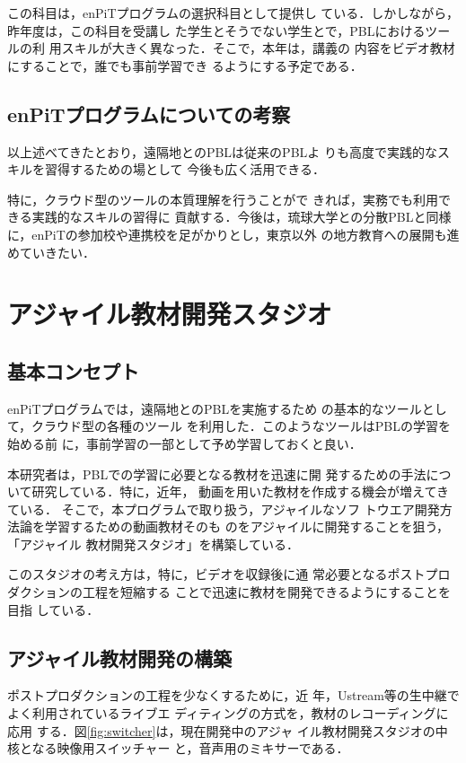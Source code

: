 \documentclass[a4j, 12Q, twocolumn, twoside]{jsarticle}
\begin{document}
この科目は，enPiTプログラムの選択科目として提供し
ている．しかしながら，昨年度は，この科目を受講し
た学生とそうでない学生とで，PBLにおけるツールの利
用スキルが大きく異なった．そこで，本年は，講義の
内容をビデオ教材にすることで，誰でも事前学習でき
るようにする予定である．


\subsection{enPiTプログラムについての考察}
以上述べてきたとおり，遠隔地とのPBLは従来のPBLよ
りも高度で実践的なスキルを習得するための場として
今後も広く活用できる．

特に，クラウド型のツールの本質理解を行うことがで
きれば，実務でも利用できる実践的なスキルの習得に
貢献する．今後は，琉球大学との分散PBLと同様
に，enPiTの参加校や連携校を足がかりとし，東京以外
の地方教育への展開も進めていきたい．

\section{アジャイル教材開発スタジオ}
\subsection{基本コンセプト}

enPiTプログラムでは，遠隔地とのPBLを実施するため
の基本的なツールとして，クラウド型の各種のツール
を利用した．このようなツールはPBLの学習を始める前
に，事前学習の一部として予め学習しておくと良い．

本研究者は，PBLでの学習に必要となる教材を迅速に開
発するための手法について研究している．特に，近年，
動画を用いた教材を作成する機会が増えてきている．
そこで，本プログラムで取り扱う，アジャイルなソフ
トウエア開発方法論を学習するための動画教材そのも
のをアジャイルに開発することを狙う，「アジャイル
教材開発スタジオ」を構築している\cite{中鉢欣
  秀:2012}．

このスタジオの考え方は，特に，ビデオを収録後に通
常必要となるポストプロダクションの工程を短縮する
ことで迅速に教材を開発できるようにすることを目指
している．

\subsection{アジャイル教材開発の構築}

ポストプロダクションの工程を少なくするために，近
年，Ustream等の生中継でよく利用されているライブエ
ディティングの方式を，教材のレコーディングに応用
する．図\ref{fig:switcher}は，現在開発中のアジャ
イル教材開発スタジオの中核となる映像用スイッチャー
と，音声用のミキサーである．
\end{document}
